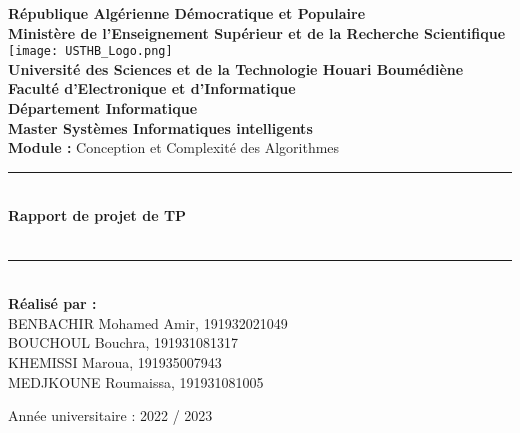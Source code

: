 \documentclass[12pt]{report}
\newcommand{\HRule}{\rule{\linewidth}{0.5mm}}
\begin{document}
    \begin{titlepage}
        \begin{center}
            \textbf{République Algérienne Démocratique et Populaire}\\
            \textbf{Ministère de l'Enseignement Supérieur et de la Recherche Scientifique}\\[1cm]
            
            \texttt{[image: USTHB\_Logo.png]}\\[1cm]
            
            \large
            \textbf{Université des Sciences et de la Technologie Houari Boumédiène}\\[0.5cm]
            \textbf{Faculté d'Electronique et d'Informatique}\\
            \textbf{Département Informatique}\\[0.5cm]

            \Large
            \textbf{Master Systèmes Informatiques intelligents}\\[0.5cm]
            
            \textbf{Module :} Conception et Complexité des Algorithmes

            \HRule \\[0.4cm]
            \LARGE{\textbf{Rapport de projet de TP}\\
            \textit{}\\[0.4cm]}
            \HRule \\[2cm]
            
            \large
            \textbf{Réalisé par :}\\
            BENBACHIR Mohamed Amir, 191932021049\\
            BOUCHOUL Bouchra, 191931081317\\
            KHEMISSI Maroua, 191935007943\\
            MEDJKOUNE Roumaissa, 191931081005
            
            \vfill
            Année universitaire : 2022 / 2023
        \end{center}
    \end{titlepage}
    \normalsize
    \tableofcontents
    
    \newpage
    \onehalfspacing
    
    
    \newpage
    \onehalfspacing
    
    
    \newpage
    \onehalfspacing
    
    
    \newpage
    \onehalfspacing
    
    
    \newpage
    \onehalfspacing
    
    
    \newpage
    \onehalfspacing
    
    
    
    \newpage
    \onehalfspacing
    
    
    \newpage
    \onehalfspacing
    
    
    \newpage
    \onehalfspacing
    
\end{document}

